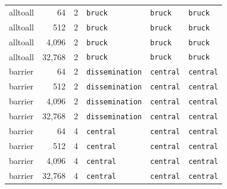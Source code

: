 \begin{tabular}{lrrlll}
alltoall & 64 & 2 & \texttt{bruck} & \texttt{bruck} & \texttt{bruck} \\
alltoall & 512 & 2 & \texttt{bruck} & \texttt{bruck} & \texttt{bruck} \\
alltoall & 4,096 & 2 & \texttt{bruck} & \texttt{bruck} & \texttt{bruck} \\
alltoall & 32,768 & 2 & \texttt{bruck} & \texttt{bruck} & \texttt{bruck} \\
barrier & 64 & 2 & \texttt{dissemination} & \texttt{central} & \texttt{central} \\
barrier & 512 & 2 & \texttt{dissemination} & \texttt{central} & \texttt{central} \\
barrier & 4,096 & 2 & \texttt{dissemination} & \texttt{central} & \texttt{central} \\
barrier & 32,768 & 2 & \texttt{dissemination} & \texttt{central} & \texttt{central} \\
barrier & 64 & 4 & \texttt{central} & \texttt{central} & \texttt{central} \\
barrier & 512 & 4 & \texttt{central} & \texttt{central} & \texttt{central} \\
barrier & 4,096 & 4 & \texttt{central} & \texttt{central} & \texttt{central} \\
barrier & 32,768 & 4 & \texttt{central} & \texttt{central} & \texttt{central} \\
\bottomrule
\end{tabular}
